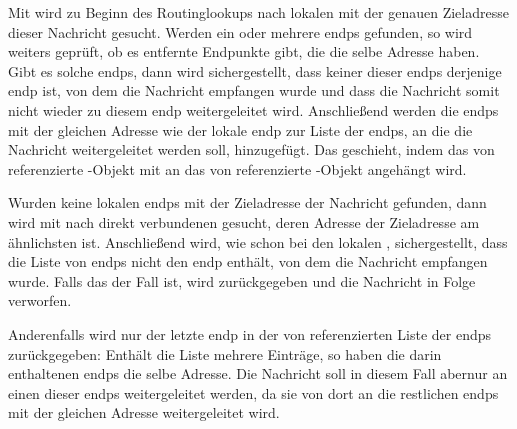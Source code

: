Mit  wird zu Beginn des Routinglookups
nach lokalen  mit der genauen Zieladresse dieser Nachricht gesucht.
Werden ein oder mehrere \glspl{endp} gefunden, so wird weiters geprüft, ob es entfernte Endpunkte
gibt, die die selbe Adresse haben. Gibt es solche \glspl{endp}, dann wird sichergestellt, dass
keiner dieser \glspl{endp} derjenige \gls{endp} ist, von dem die Nachricht empfangen wurde und
dass die Nachricht somit nicht wieder zu diesem \gls{endp} weitergeleitet wird.
Anschließend werden die \glspl{endp} mit der gleichen Adresse wie der lokale \gls{endp} zur Liste
der \glspl{endp}, an die die Nachricht weitergeleitet werden soll, hinzugefügt.
Das geschieht, indem das von  referenzierte -Objekt
mit  an das von  referenzierte
-Objekt angehängt wird.

Wurden keine lokalen \glspl{endp} mit der Zieladresse der Nachricht gefunden, dann wird mit
 nach direkt verbundenen
 gesucht, deren Adresse der Zieladresse am ähnlichsten ist.
Anschließend wird, wie schon bei den lokalen , sichergestellt,
dass die Liste von \glspl{endp} nicht den \gls{endp} enthält, von dem die Nachricht empfangen
wurde.
Falls das der Fall ist, wird  zurückgegeben und die Nachricht in Folge verworfen.

Anderenfalls wird nur der letzte \gls{endp} in der von  referenzierten
Liste der \glspl{endp} zurückgegeben: Enthält die Liste mehrere Einträge, so haben die darin
enthaltenen \glspl{endp} die selbe Adresse. Die Nachricht soll in diesem Fall abernur an einen
dieser \glspl{endp} weitergeleitet werden, da sie von dort an die restlichen \glspl{endp} mit der
gleichen Adresse weitergeleitet wird.




